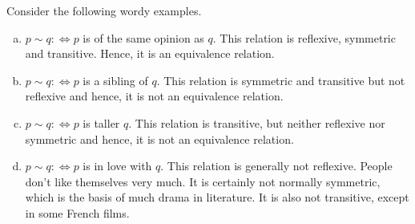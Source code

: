 \begin{example}
	Consider the following wordy examples.
	\begin{enumerate}[(a)]
		\item $p\sim q :\iff p$ is of the same opinion as $q$. This relation is reflexive, symmetric and transitive. Hence, it is an equivalence relation.
		\item $p\sim q :\iff p$ is a sibling of $q$. This relation is symmetric and transitive but not reflexive and hence, it is not an equivalence relation.
		\item $p\sim q :\iff p$ is taller $q$. This relation is transitive, but neither reflexive nor symmetric and hence, it is not an equivalence relation.
		\item $p\sim q :\iff p$ is in love with $q$. This relation is generally not reflexive. People don't like themselves very much. It is certainly not normally symmetric, which is the basis of much drama in literature. It is also not transitive, except in some French films.
	\end{enumerate}
\end{example}

